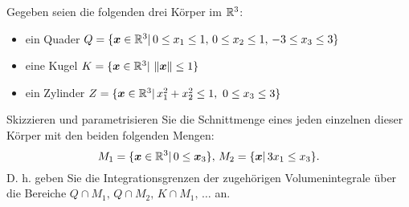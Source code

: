 {
Gegeben seien die folgenden drei K\"orper im $\mathbb{R}^3$: 
\begin{itemize}
\item ein Quader $Q=\{\boldsymbol x\in\mathbb{R}^3|\, 0\leq x_1\leq 1,\, 0\leq x_2\leq 1,\, -3\leq x_3\leq 3\}$
\item eine Kugel $K=\{\boldsymbol x\in\mathbb{R}^3|\, \left\Vert{\boldsymbol x}\right\Vert\leq 1\}$
\item ein Zylinder $Z=\{\boldsymbol x\in\mathbb{R}^3|\, x_1^2+x_2^2\leq 1,\ 0\leq x_3\leq 3\}$
\end{itemize}
Skizzieren und parametrisieren Sie die Schnittmenge eines jeden einzelnen dieser K\"orper mit den beiden folgenden Mengen: 
$$M_1=\{\boldsymbol x\in\mathbb{R}^3|\, 0\leq \boldsymbol x_3\},\, M_2=\{\boldsymbol x|\,3x_1\leq x_3\}.$$ 
D. h. geben Sie die Integrationsgrenzen der zugeh\"origen Volumenintegrale \"uber die Bereiche $Q\cap M_1,\, Q\cap M_2,\, K\cap M_1,\, \hdots$ an.
 
}

